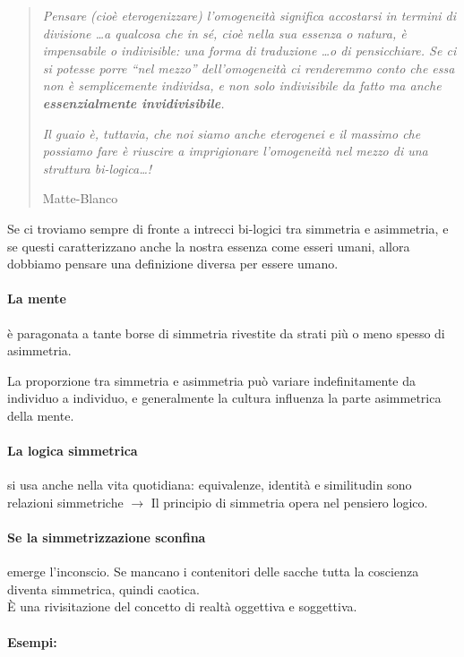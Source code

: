 \documentclass[12pt, a4paper]{article}
\begin{document}
\begin{quote}
    \emph{Pensare (cioè eterogenizzare) l'omo\-ge\-nei\-tà significa accostarsi in termini di divisione \ldots a qualcosa che in sé, cioè nella sua essenza o natura, è impensabile o indivisible: una forma di traduzione \ldots o di pensicchiare. Se ci si potesse porre ``nel mezzo'' dell'omo\-ge\-nei\-tà ci renderemmo conto che essa non è semplicemente individsa, e non solo indivisibile da fatto ma anche \textbf{essenzialmente invidivisibile}.} 

\emph{Il guaio è, tuttavia, che
noi siamo anche eterogenei e il massimo che possiamo fare è riuscire a imprigionare l'omogeneità nel mezzo di una struttura bi-logica\ldots!}
    \begin{flushright}
        Matte-Blanco
    \end{flushright}
\end{quote} 
Se ci troviamo sempre di fronte a intrecci bi-logici tra simmetria e asimmetria, e se questi caratterizzano anche la nostra essenza come esseri umani, allora dobbiamo pensare una definizione diversa per essere umano.

\paragraph{La mente}  è paragonata a tante borse di simmetria rivestite da strati più o meno spesso di asimmetria.

La proporzione tra simmetria e asimmetria può variare indefinitamente da individuo a individuo, e generalmente la cultura influenza la parte asimmetrica della mente.

\paragraph{La logica simmetrica}  si usa anche nella vita quotidiana: equivalenze, identità e similitudin  sono relazioni simmetriche $\rightarrow$ Il principio di simmetria opera nel pensiero logico.

\paragraph{Se la simmetrizzazione sconfina }  emerge l'inconscio. Se mancano i contenitori delle sacche tutta la coscienza diventa simmetrica, quindi caotica.\\
È una rivisitazione del concetto di realtà oggettiva e soggettiva.

\paragraph{Esempi:}  
\end{document}
